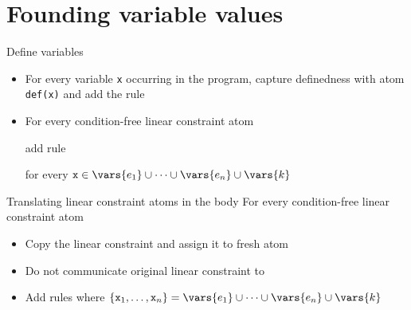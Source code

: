 \documentclass[11pt]{beamer}
\begin{document}
\section{Founding variable values}

\begin{frame}{Define variables}
  \begin{itemize}
    \item For every variable \texttt{x} occurring in the program, capture definedness with atom \texttt{def(x)} and add the rule

    \pause
    \item For every condition-free linear constraint atom
    
       add rule
       
       for every $\mathtt{x} \in \vars{e_1}\cup\dots\cup\vars{e_n}\cup\vars{k}$
   \end{itemize}
\end{frame}

\begin{frame}{Translating linear constraint atoms in the body}
  For every condition-free linear constraint atom
    
    \pause
    \begin{itemize}
      \item Copy the linear constraint and assign it to fresh atom
           \pause
      \item Do not communicate original linear constraint to \clingcon\ \pause
      \item Add rules
      \only<4>{}
      where $\{\mathtt{x}_1,\dots,\mathtt{x}_n\}=\vars{e_1}\cup\dots\cup\vars{e_n}\cup\vars{k}$
    \end{itemize}
\end{frame}
\end{document}

